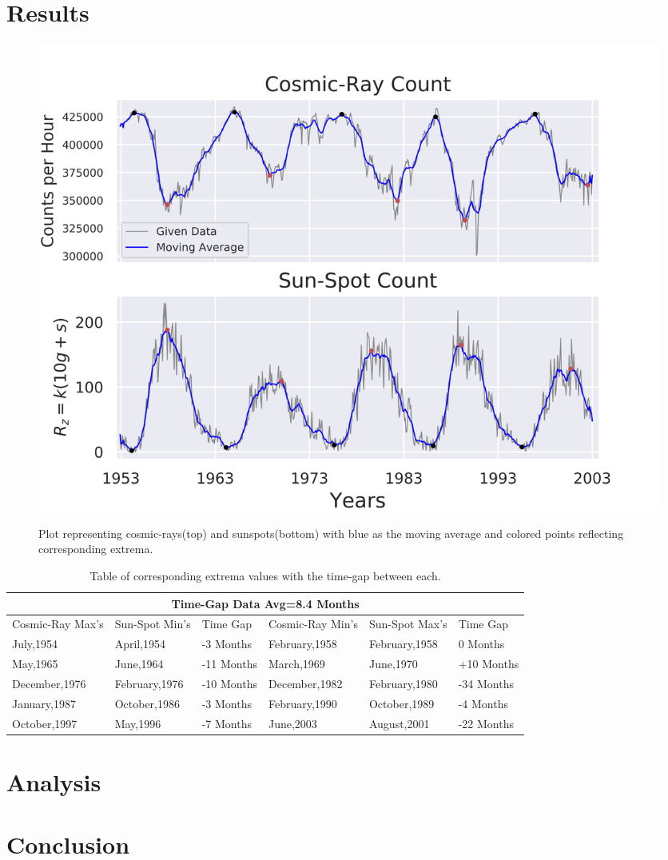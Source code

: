 \documentclass{article}
\begin{document}
\section{Results}
\begin{figure}[h!]
\centering
\caption{Plot representing cosmic-rays(top) and sunspots(bottom) with
blue as the moving average and colored points reflecting
corresponding extrema.}
\includegraphics[scale=0.7]{plot.png}
\label{fig:sundata}
\end{figure}
\begin{table}[h!]
 \centering
 \small
 \caption{Table of corresponding extrema values with the time-gap between each.}
 \label{tbl:timegap}
 \begin{tabular}{| p{2cm} |p{2cm} |p{1cm}||p{2cm}|p{2cm}|p{1cm}|  }
  \hline
  \multicolumn{6}{|c|}{Time-Gap Data Avg=8.4 Months} \\
  \hline
  Cosmic-Ray Max's&Sun-Spot Min's&Time Gap&Cosmic-Ray Min's&Sun-Spot Max's&Time Gap\\
  \hline
  July,1954&April,1954&-3 Months&February,1958&February,1958&0 Months\\
  May,1965&June,1964&-11 Months&March,1969&June,1970&+10 Months\\
  December,1976&February,1976&-10 Months&December,1982&February,1980&-34 Months\\
  January,1987&October,1986&-3 Months&February,1990&October,1989&-4 Months\\
  October,1997&May,1996&-7 Months&June,2003&August,2001&-22 Months\\
  \hline
 \end{tabular}
\end{table}
\newpage
\section{Analysis}


\newpage
\section{Conclusion}


\newpage


\end{document}
